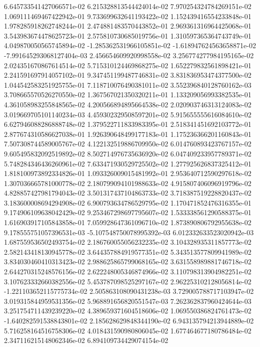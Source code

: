 6.645733541427066571e-02
6.215328813544424014e-02
7.970254324784269151e-02
1.069111469467422942e-01
9.733699632641193422e-02
1.152439416554233848e-01
1.978285918262748244e-01
2.474881483570443852e-01
2.969361316964425068e-01
3.543983674478625723e-01
2.575810730685019756e-01
1.310597365364743749e-01
4.049870050565745894e-02
-1.285362531966105851e-02
-1.618947624563658871e-02
-7.991645293068127404e-03
2.456654609920998558e-02
3.256774277984195165e-02
2.024351670867614514e-02
5.715310124469868275e-02
1.652279832561898421e-01
2.241591697914057102e-01
9.347451199487746831e-02
3.831836953474377500e-02
1.044542583251925755e-01
7.118710076490381011e-02
3.552396840128760162e-03
3.708665570526270550e-02
1.367567021350320211e-01
1.133209056993382535e-01
4.361058983255848565e-02
4.200566894895664538e-02
2.020903746313124083e-02
3.019669705101140234e-03
4.459302329508597201e-02
5.915655555616084610e-02
6.627946088286888748e-02
1.379522711833983395e-01
2.518341451692103772e-01
2.877674310586627038e-01
1.926390648499177183e-01
1.175236366201160843e-01
7.507308744589005767e-02
4.122132519886709950e-02
6.014760893423767157e-02
9.605495832092519892e-02
8.502714976735636920e-02
6.047409233957789371e-02
5.748284346436260961e-02
7.633471930529725502e-02
1.277925626837325412e-01
1.818100973892334826e-01
1.093326009015481992e-01
2.953640712590297618e-02
1.307036665781000778e-02
2.180799094101988633e-02
4.915807406096919796e-02
4.828857427981794043e-02
3.501317437104863733e-02
3.718387519228820437e-02
3.183600008694294908e-02
6.900793634786529795e-02
1.170471852476316355e-01
9.174906109638042429e-02
9.253467298697795607e-02
1.533338561290588375e-01
1.616903917105843858e-01
7.059928647361096710e-02
1.873890806792955638e-02
9.178555751057396531e-03
-5.107548750078995392e-03
6.012332633523020942e-03
1.687559536502493754e-02
2.186760055056232235e-02
3.104328935311857773e-02
2.582143418130945778e-02
3.644357884919577351e-02
5.343513577809941989e-02
3.834030460410313423e-02
2.988625865799068165e-02
3.631558989881746718e-02
2.644270315248576156e-02
2.622248005346874966e-02
3.110798313904982251e-02
3.107623332660382556e-02
5.453787098525297167e-02
2.962253102128056814e-02
-1.221103652115775734e-02
2.505863108090431238e-03
3.729005788717103947e-02
3.019315844959531356e-02
5.968891656820551547e-03
7.262362837960424644e-03
3.251754711439239220e-02
4.389659371604518606e-02
1.069550386824761473e-02
-1.640282591538843801e-02
2.185628629848344190e-02
6.943135794213944889e-02
5.716258164516758306e-02
4.018431590980806045e-02
1.677464677180786484e-02
2.347116215148062346e-02
6.894109734429074154e-02
